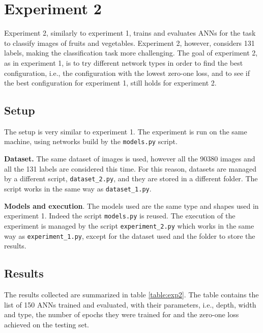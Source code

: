 \section{Experiment 2}
\label{sec:exp2}
Experiment 2, similarly to experiment 1, trains and evaluates ANNs for the task to classify images of fruits and vegetables. Experiment 2, however, considers 131 labels, making the classification task more challenging. The goal of experiment 2, as in experiment 1, is to try different network types in order to find the best configuration, i.e., the configuration with the lowest zero-one loss, and to see if the best configuration for experiment 1, still holds for experiment 2.

\subsection{Setup}
The setup is very similar to experiment 1. The experiment is run on the same machine, using networks build by the \texttt{models.py} script.

\textbf{Dataset.} The same dataset of images is used, however all the 90380 images and all the 131 labels are considered this time. For this reason, datasets are managed by a different script, \texttt{dataset\_2.py}, and they are stored in a different folder. The script works in the same way as \texttt{dataset\_1.py}.

\textbf{Models and execution}. The models used are the same type and shapes used in experiment 1. Indeed the script \texttt{models.py} is reused. The execution of the experiment is managed by the script \texttt{experiment\_2.py} which works in the same way as \texttt{experiment\_1.py}, except for the dataset used and the folder to store the results.

\subsection{Results}
The results collected are summarized in table \ref{table:exp2}. The table contains the list of 150 ANNs trained and evaluated, with their parameters, i.e., depth, width and type, the number of epochs they were trained for and the zero-one loss achieved on the testing set.


